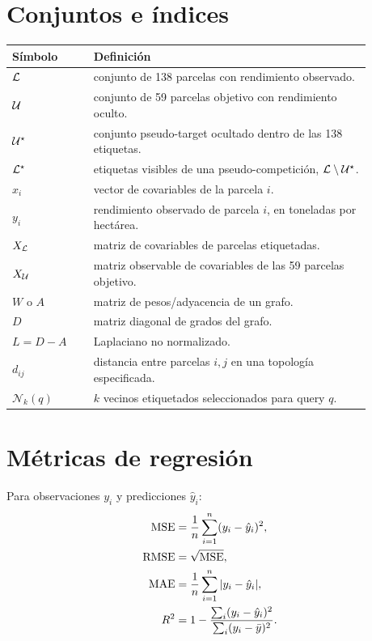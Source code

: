 \section{Conjuntos e índices}

\begin{longtable}{p{0.20\linewidth}p{0.68\linewidth}}
\toprule
Símbolo & Definición \\
\midrule
\endhead
$\mathcal{L}$ & conjunto de 138 parcelas con rendimiento observado. \\
$\mathcal{U}$ & conjunto de 59 parcelas objetivo con rendimiento oculto. \\
$\mathcal{U}^\star$ & conjunto pseudo-target ocultado dentro de las 138 etiquetas. \\
$\mathcal{L}^\star$ & etiquetas visibles de una pseudo-competición,
$\mathcal{L}\setminus\mathcal{U}^\star$. \\
$x_i$ & vector de covariables de la parcela $i$. \\
$y_i$ & rendimiento observado de parcela $i$, en toneladas por hectárea. \\
$X_{\mathcal{L}}$ & matriz de covariables de parcelas etiquetadas. \\
$X_{\mathcal{U}}$ & matriz observable de covariables de las 59 parcelas objetivo. \\
$W$ o $A$ & matriz de pesos/adyacencia de un grafo. \\
$D$ & matriz diagonal de grados del grafo. \\
$L=D-A$ & Laplaciano no normalizado. \\
$d_{ij}$ & distancia entre parcelas $i,j$ en una topología especificada. \\
$\mathcal N_k(q)$ & $k$ vecinos etiquetados seleccionados para query $q$. \\
\bottomrule
\end{longtable}

\section{Métricas de regresión}

Para observaciones $y_i$ y predicciones $\hat y_i$:
\begin{align}
\operatorname{MSE}
&=
\frac{1}{n}\sum_{i=1}^n(y_i-\hat y_i)^2,\\
\operatorname{RMSE}
&=
\sqrt{\operatorname{MSE}},\\
\operatorname{MAE}
&=
\frac{1}{n}\sum_{i=1}^n|y_i-\hat y_i|,\\
R^2
&=
1-
\frac{\sum_i(y_i-\hat y_i)^2}
{\sum_i(y_i-\bar y)^2}.
\end{align}

